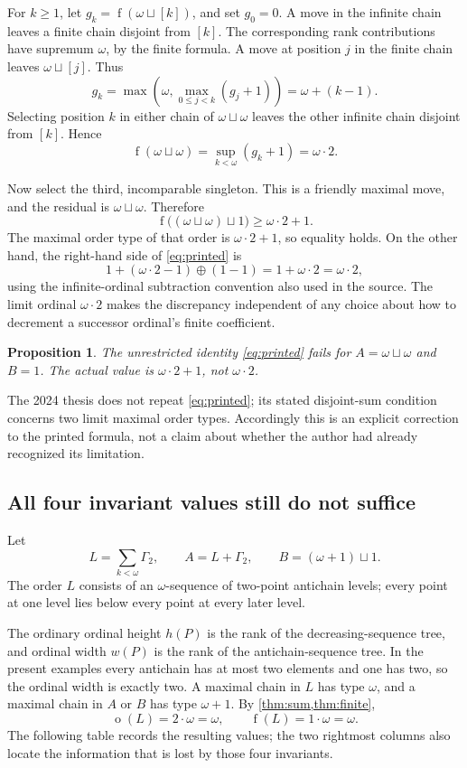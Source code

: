 \documentclass[11pt,a4paper]{article}
\newtheorem{proposition}[proposition]{Proposition}
\theoremstyle{definition}
\theoremstyle{remark}
\DeclareMathOperator{\mot}{o}
\DeclareMathOperator{\fot}{f}
\newcommand{\ds}{\mathbin{\sqcup}}
\begin{document}
For $k\geq1$, let $g_k=\fot(\omega\ds[k])$, and set $g_0=0$. A move in the
infinite chain leaves a finite chain disjoint from $[k]$. The corresponding
rank contributions have supremum $\omega$, by the finite formula. A move
at position $j$ in the finite chain leaves $\omega\ds[j]$. Thus
\[
g_k=\max\left(\omega,\max_{0\leq j<k}(g_j+1)\right)
=\omega+(k-1).
\]
Selecting position $k$ in either chain of $\omega\ds\omega$ leaves the
other infinite chain disjoint from $[k]$. Hence
\begin{equation}\label{eq:two-chains-direct}
\fot(\omega\ds\omega)=\sup_{k<\omega}(g_k+1)=\omega\cdot2.
\end{equation}

Now select the third, incomparable singleton. This is a friendly maximal
move, and the residual is $\omega\ds\omega$. Therefore
\[
\fot\bigl((\omega\ds\omega)\ds1\bigr)\geq\omega\cdot2+1.
\]
The maximal order type of that order is $\omega\cdot2+1$, so equality holds.
On the other hand, the right-hand side of \eqref{eq:printed} is
\[
1+(\omega\cdot2-1)\oplus(1-1)=1+\omega\cdot2=\omega\cdot2,
\]
using the infinite-ordinal subtraction convention also used in the source.
The limit ordinal $\omega\cdot2$ makes the discrepancy independent of any
choice about how to decrement a successor ordinal's finite coefficient.

\begin{proposition}\label{prop:printed-counterexample}
The unrestricted identity \eqref{eq:printed} fails for
$A=\omega\ds\omega$ and $B=1$. The actual value is $\omega\cdot2+1$, not
$\omega\cdot2$.
\end{proposition}

The 2024 thesis does not repeat \eqref{eq:printed}; its stated disjoint-sum
condition concerns two limit maximal order types. Accordingly this is an
explicit correction to the printed formula, not a claim about whether the
author had already recognized its limitation.

\subsection{All four invariant values still do not suffice}

Let
\[
L=\sum_{k<\omega}\Gamma_2,\qquad
A=L+\Gamma_2,\qquad B=(\omega+1)\ds1.
\]
The order $L$ consists of an $\omega$-sequence of two-point antichain levels;
every point at one level lies below every point at every later level.

The ordinary ordinal height $h(P)$ is the rank of the decreasing-sequence
tree, and ordinal width $w(P)$ is the rank of the antichain-sequence tree.
In the present examples every antichain has at most two elements and one
has two, so the ordinal width is exactly two. A maximal chain in $L$ has
type $\omega$, and a maximal chain in $A$ or $B$ has type $\omega+1$.
By \cref{thm:sum,thm:finite},
\[
\mot(L)=2\cdot\omega=\omega,\qquad
\fot(L)=1\cdot\omega=\omega.
\]
The following table records the resulting values; the two rightmost columns
also locate the information that is lost by those four invariants.
\end{document}
